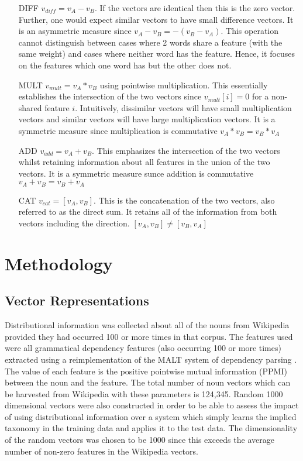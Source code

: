 \documentclass[11pt]{article}
\begin{document}
\begin{itemize}
\item[DIFF]{$v_{diff} = v_A - v_B$.  If the vectors are identical then this is the zero vector.  Further, one would expect similar vectors to have small difference vectors.  It is an asymmetric measure since $v_A - v_B = -(v_B - v_A)$.  This operation cannot distinguish between cases where 2 words share a feature (with the same weight) and cases where neither word has the feature.  Hence, it focuses on the features which one word has but the other does not.}
\item[MULT]{$v_{mult} = v_A * v_B$ using pointwise multiplication.  This essentially establishes the intersection of the two vectors since $v_{mult}[i] = 0$ for a non-shared feature $i$.   Intuitively,  dissimilar vectors will have small multiplication vectors and similar vectors will have large multiplication vectors.  It is a symmetric measure since multiplication is commutative $v_A * v_B = v_B * v_A$ }
\item[ADD]{$v_{add} = v_A + v_B$.  This emphasizes the intersection of the two vectors whilst retaining information about all features in the union of the two vectors.  It is a symmetric measure sunce addition is commutative $v_A + v_B = v_B + v_A$}
\item[CAT]{$v_{cat} = [v_A,v_B]$.  This is the concatenation of the two vectors, also referred to as the direct sum.  It retains all of the information from both vectors including the direction.    $[v_A,v_B] \neq [v_B,v_A]$}
\end{itemize}

\section{Methodology}

\subsection{Vector Representations}

Distributional information was collected about all of the nouns from Wikipedia provided they had occurred 100 or more times in that corpus.  The features used were all grammatical dependency features (also occurring 100 or more times) extracted using a reimplementation of the MALT system of dependency parsing \cite{Nivre2006}.  The value of each feature is the positive pointwise mutual information (PPMI) between the noun and the feature. The total number of noun vectors which can be harvested from Wikipedia with these parameters is 124,345.  Random 1000 dimensional vectors were also constructed in order to be able to assess the impact of using distributional information over a system which simply learns the implied taxonomy in the training data and applies it to the test data.  The dimensionality of the random vectors was chosen to be 1000 since this exceeds the average number of non-zero features in the Wikipedia vectors.
\end{document}
